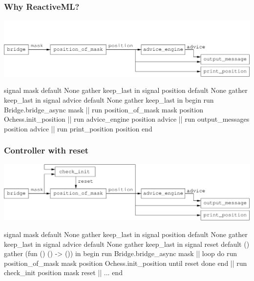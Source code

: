 \documentclass[t]{beamer}
\begin{document}

\begin{frame}[fragile]
\frametitle{Why ReactiveML?}

\includegraphics[scale=0.6]{figures/controller}

\begin{lstrml}
  signal mask default None gather keep_last in
  signal position default None gather keep_last in
  signal advice default None gather keep_last in
  begin
    run Bridge.bridge_async mask ||
    run position_of_mask mask position Ochess.init_position ||
    run advice_engine position advice ||
    run output_messages position advice ||
    run print_position position
  end
\end{lstrml}

\end{frame}


\begin{frame}[fragile]
\frametitle{Controller with reset}

\includegraphics[scale=0.6]{figures/controller-with-reset}

\begin{lstrml}
  signal mask default None gather keep_last in
  signal position default None gather keep_last in
  signal advice default None gather keep_last in
  signal reset default () gather (fun () () -> ()) in
  begin
    run Bridge.bridge_async mask ||
    loop
      do
        run position_of_mask mask position Ochess.init_position
      until reset done
    end ||
    run check_init position mask reset ||
    ...
  end
\end{lstrml}

\end{frame}
\end{document}
